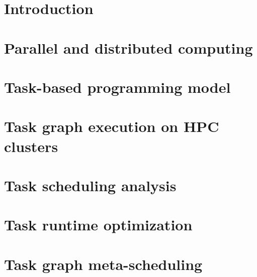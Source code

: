 \documentclass[english,phd]{diploma}
\begin{document}
\MakeTitlePages

\printglossaries

\listoffigures
\clearpage

\listoftables
\clearpage

\lstlistoflistings
\clearpage

\nocite{estee, rsds, ligate}

\chapter{Introduction}
\label{ch:Introduction}


\chapter{Parallel and distributed computing}
\label{ch:distributed-computing}


\chapter{Task-based programming model}
\label{ch:taskgraphs}


\chapter{Task graph execution on HPC clusters}
\label{ch:sota}


\chapter{Task scheduling analysis}
\label{ch:estee}


\chapter{Task runtime optimization}
\label{ch:rsds}


\chapter{Task graph meta-scheduling}
\label{ch:hyperqueue}

\end{document}
